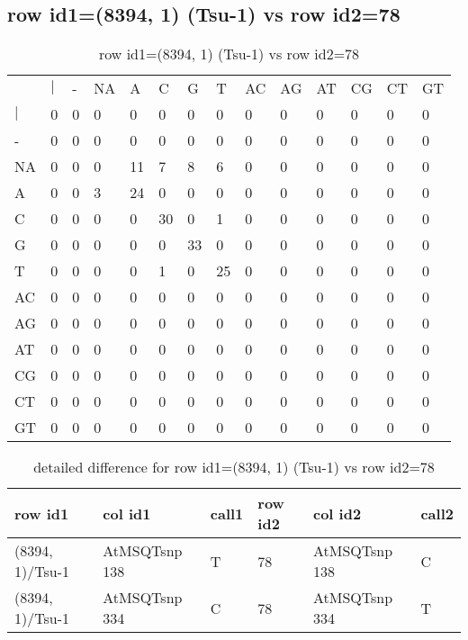 \subsection{row id1=(8394, 1) (Tsu-1) vs row id2=78}
\begin{center}
\begin{longtable}{|l|l|l|l|l|l|l|l|l|l|l|l|l|l|}
\caption{row id1=(8394, 1) (Tsu-1) vs row id2=78} \label{table_dm650}\\
\hline
\\
\hline
&$|$&-&NA&A&C&G&T&AC&AG&AT&CG&CT&GT\\
$|$&0&0&0&0&0&0&0&0&0&0&0&0&0\\
-&0&0&0&0&0&0&0&0&0&0&0&0&0\\
NA&0&0&0&11&7&8&6&0&0&0&0&0&0\\
A&0&0&3&24&0&0&0&0&0&0&0&0&0\\
C&0&0&0&0&30&0&1&0&0&0&0&0&0\\
G&0&0&0&0&0&33&0&0&0&0&0&0&0\\
T&0&0&0&0&1&0&25&0&0&0&0&0&0\\
AC&0&0&0&0&0&0&0&0&0&0&0&0&0\\
AG&0&0&0&0&0&0&0&0&0&0&0&0&0\\
AT&0&0&0&0&0&0&0&0&0&0&0&0&0\\
CG&0&0&0&0&0&0&0&0&0&0&0&0&0\\
CT&0&0&0&0&0&0&0&0&0&0&0&0&0\\
GT&0&0&0&0&0&0&0&0&0&0&0&0&0\\
\hline
\end{longtable}
\end{center}

\begin{center}
\begin{longtable}{|l|l|l|l|l|l|}
\caption{detailed difference for row id1=(8394, 1) (Tsu-1) vs row id2=78} \label{table_dm651}\\
\hline
row id1&col id1&call1&row id2&col id2&call2\\
\hline
(8394, 1)/Tsu-1&AtMSQTsnp 138&T&78&AtMSQTsnp 138&C\\
(8394, 1)/Tsu-1&AtMSQTsnp 334&C&78&AtMSQTsnp 334&T\\
\hline
\end{longtable}
\end{center}

